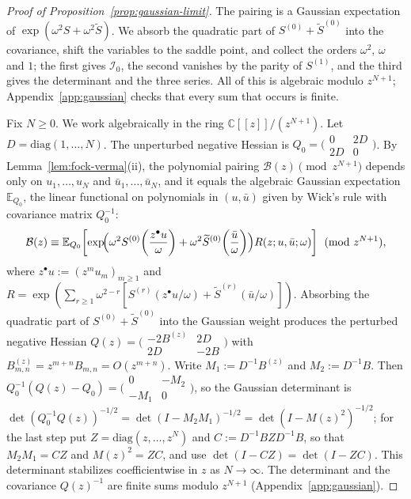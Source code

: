 \documentclass[twoside,10pt]{article}
\numberwithin{equation}{section}
\theoremstyle{slbody}
\theoremstyle{definition}
\theoremstyle{remark}
\begin{document}
\begin{proof}[Proof of Proposition~\ref{prop:gaussian-limit}]
The pairing is a Gaussian expectation of
\(\exp(\omega^2S+\omega^2\widetilde S)\).  We absorb the quadratic part of
\(S^{(0)}+\widetilde S^{(0)}\) into the covariance, shift the variables to the
saddle point, and collect the orders \(\omega^2\), \(\omega\) and \(1\); the
first gives \(\mathcal I_0\), the second vanishes by the parity of
\(S^{(1)}\), and the third gives the determinant and the three series.  All
of this is algebraic modulo \(z^{N+1}\); Appendix~\ref{app:gaussian} checks
that every sum that occurs is finite.

Fix \(N\geq0\).  We work algebraically in the ring
\(\mathbb C[[z]]/(z^{N+1})\).  Let \(D=\mathrm{diag}(1,\dots,N)\).  The
unperturbed negative Hessian is
\(Q_0=\bigl(\begin{smallmatrix}0&2D\\2D&0\end{smallmatrix}\bigr)\).  By Lemma~\ref{lem:fock-verma}(ii), the
polynomial pairing \(\mathcal B(z)\pmod{z^{N+1}}\) depends only on
\(u_1,\dots,u_N\) and \(\bar u_1,\dots,\bar u_N\), and it equals the algebraic
Gaussian expectation \(\mathbb E_{Q_0}\), the linear functional on
polynomials in \((u,\bar u)\) given by Wick's rule with covariance matrix
\(Q_0^{-1}\):
\[
 \mathcal B(z)\equiv
 \mathbb E_{Q_0}\!\left[\exp\!\Bigl(
 \omega^2 S^{(0)}\!\left(\frac{z^\bullet u}{\omega}\right)
 +\omega^2\widetilde S^{(0)}\!\left(\frac{\bar u}{\omega}\right)\Bigr)
 R(z;u,\bar u;\omega)\right]\pmod{z^{N+1}},
\]
where \(z^\bullet u:=(z^mu_m)_{m\geq1}\) and
\(R=\exp(\sum_{r\geq1}\omega^{2-r}[S^{(r)}(z^\bullet u/\omega)+\widetilde S^{(r)}(\bar u/\omega)])\).
Absorbing the quadratic part of \(S^{(0)}+\widetilde S^{(0)}\) into the
Gaussian weight produces the perturbed negative Hessian
\(Q(z)=\bigl(\begin{smallmatrix}-2B^{(z)}&2D\\2D&-2B\end{smallmatrix}\bigr)\)
with \(B^{(z)}_{m,n}=z^{m+n}B_{m,n}=O(z^{m+n})\).  Write
\(M_1:=D^{-1}B^{(z)}\) and \(M_2:=D^{-1}B\).  Then
\(Q_0^{-1}(Q(z)-Q_0)=\bigl(\begin{smallmatrix}0&-M_2\\-M_1&0\end{smallmatrix}\bigr)\),
so the Gaussian determinant is
\(\det(Q_0^{-1}Q(z))^{-1/2}=\det(I-M_2M_1)^{-1/2}=\det(I-M(z)^2)^{-1/2}\);
for the last step put \(Z=\mathrm{diag}(z,\dots,z^N)\) and
\(C:=D^{-1}BZD^{-1}B\), so that \(M_2M_1=CZ\) and \(M(z)^2=ZC\), and use
\(\det(I-CZ)=\det(I-ZC)\).  This determinant stabilizes coefficientwise in
\(z\) as \(N\to\infty\).  The determinant and the covariance \(Q(z)^{-1}\) are finite
sums modulo \(z^{N+1}\) (Appendix~\ref{app:gaussian}).


\end{proof}
\end{document}
